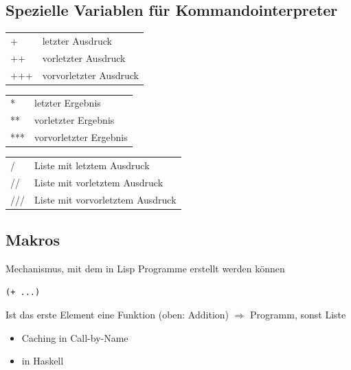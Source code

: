 		\begin{figure}[H]
		\end{figure}



\newpage
\subsection{Spezielle Variablen für Kommandointerpreter} %
\label{sub:spezielle_variablen_fuer_kommandointerpreter}

	\begin{tabular}{ll}
	+	&	letzter Ausdruck	\\
	++	&	vorletzter Ausdruck	\\
	+++	&	vorvorletzter Ausdruck
	\end{tabular}

	\begin{tabular}{ll}
	*	&	letzter Ergebnis	\\
	**	&	vorletzter Ergebnis	\\
	***	&	vorvorletzter Ergebnis
	\end{tabular}

	\begin{tabular}{ll}
	/	&	Liste mit letztem Ausdruck	\\
	//	&	Liste mit vorletztem Ausdruck	\\
	///	&	Liste mit vorvorletztem Ausdruck
	\end{tabular}

\subsection{Makros} %
\label{sub:makros}

	Mechanismus, mit dem in Lisp Programme erstellt werden können\\
	\begin{lstlisting}
(+ ...)
	\end{lstlisting}

	Ist das erste Element eine Funktion (oben: Addition) $\Rightarrow$ Programm, sonst Liste
	\begin{itemize}
				\item Caching in Call-by-Name
				\item in Haskell
			\end{itemize}


